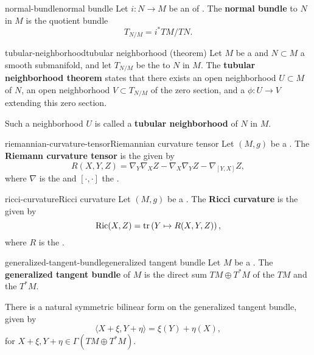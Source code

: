 \begin{topic}{normal-bundle}{normal bundle}
    Let $i : N \to M$ be an  of . The \textbf{normal bundle} to $N$ in $M$ is the quotient bundle
    \[ T_{N/M} = i^* TM / TN . \]
\end{topic}

\begin{topic}{tubular-neighborhood}{tubular neighborhood (theorem)}
    Let $M$ be a  and $N \subset M$ a smooth submanifold, and let $T_{N/M}$ be the  to $N$ in $M$. The \textbf{tubular neighborhood theorem} states that there exists an open neighborhood $U \subset M$ of $N$, an open neighborhood $V \subset T_{N/M}$ of the zero section, and a  $\phi : U \to V$ extending this zero section.
    
    Such a neighborhood $U$ is called a \textbf{tubular neighborhood} of $N$ in $M$.
\end{topic}

\begin{topic}{riemannian-curvature-tensor}{Riemannian curvature tensor}
    Let $(M, g)$ be a . The \textbf{Riemann curvature tensor} is the  given by
    \[ R(X, Y, Z) = \nabla_Y \nabla_X Z - \nabla_X \nabla_Y Z - \nabla_{[Y, X]} Z , \]
    where $\nabla$ is the  and $[\cdot, \cdot]$ the .
\end{topic}

\begin{topic}{ricci-curvature}{Ricci curvature}
    Let $(M, g)$ be a . The \textbf{Ricci curvature} is the  given by
    \[ \textup{Ric}(X, Z) = \operatorname{tr} \left( Y \mapsto R(X, Y, Z) \right), \]
    where $R$ is the .
\end{topic}

\begin{topic}{generalized-tangent-bundle}{generalized tangent bundle}
    Let $M$ be a . The \textbf{generalized tangent bundle} of $M$ is the direct sum $TM \oplus T^*M$ of the  $TM$ and the  $T^*M$.
    
    There is a natural symmetric bilinear form on the generalized tangent bundle, given by
    \[ \langle X + \xi, Y + \eta \rangle = \xi(Y) + \eta(X) , \]
    for $X + \xi, Y + \eta \in \Gamma(TM \oplus T^*M)$.
\end{topic}

